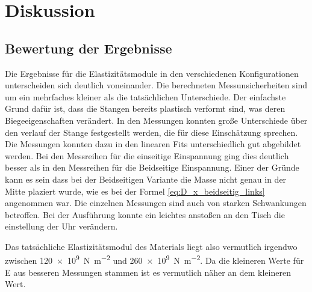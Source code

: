 
\section{Diskussion}


\subsection{Bewertung der Ergebnisse}
Die Ergebnisse für die Elastizitätsmodule in den  verschiedenen Konfigurationen
unterscheiden sich deutlich voneinander. Die berechneten Messunsicherheiten sind
um ein mehrfaches kleiner als die tatsächlichen Unterschiede.
Der einfachste Grund dafür ist, dass die Stangen bereits plastisch verformt sind,
was deren Biegeeigenschaften verändert.
In den Messungen konnten große Unterschiede über den verlauf der Stange festgestellt werden,
die für diese Einschätzung sprechen.
Die Messungen konnten dazu in den linearen Fits unterschiedlich gut abgebildet werden.
Bei den Messreihen für die einseitige Einspannung ging dies deutlich besser als in
den Messreihen für die Beidseitige Einspannung.
Einer der Gründe kann es sein dass bei der Beidseitigen Variante die Masse nicht
genau in der Mitte plaziert wurde, wie es bei der Formel \eqref{eq:D_x_beidseitig_links} angenommen war.
Die einzelnen Messungen sind auch von starken Schwankungen betroffen.
Bei der Ausführung konnte ein leichtes anstoßen an den Tisch die einstellung der Uhr verändern.

Das tatsächliche Elastizitätsmodul des Materials liegt also vermutlich irgendwo 
zwischen \qty{120 e9}{\newton\per\square\meter} und \qty{260 e9}{\newton\per\square\meter}.
Da die kleineren Werte für E aus besseren Messungen stammen ist es vermutlich näher an dem kleineren Wert.